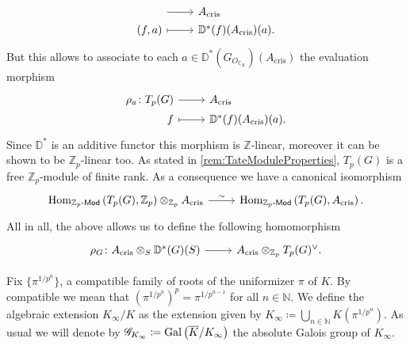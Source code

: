 \begin{rem}[]
\begin{equation*}
\begin{tikzcd}[row sep = 0ex
		,/tikz/column 1/.append style={anchor=base east}
		,/tikz/column 2/.append style={anchor=base west}]
		\arrow[r, "", rightarrow] &
		A_{\mathrm{cris}} \\
		(f,a) \arrow[r, "", mapsto] &
		\mathbb{D}^*(f)(A_{\mathrm{cris}})(a)
	.\end{tikzcd}
	\end{equation*} 
	But this allows to associate to each $a \in \mathbb{D}^*(G_{O_{\mathbb{C}_K}})(A_{\mathrm{cris}})$
	the evaluation morphism
	\begin{equation*}
	\begin{tikzcd}[row sep = 0ex
		,/tikz/column 1/.append style={anchor=base east}
		,/tikz/column 2/.append style={anchor=base west}]
		\rho_a\colon T_p(G)
		\arrow[r, "", rightarrow] &
		A_{\mathrm{cris}} \\
		f \arrow[r, "", mapsto] & 
		\mathbb{D}^*(f)(A_{\mathrm{cris}})(a)
	.\end{tikzcd}
	\end{equation*} 
	Since $\mathbb{D}^*$ is an additive functor this morphism
	is $\mathbb{Z}$-linear, moreover it can be shown to be $\mathbb{Z}_{p}$-linear too.
	As stated in \cref{rem:TateModuleProperties}, $T_p(G)$ is a free
	$\mathbb{Z}_{p}$-module of finite rank.
	As a consequence we have a canonical isomorphism
	\begin{equation*}
	\begin{tikzcd}[row sep = 0ex
		,/tikz/column 1/.append style={anchor=base east}
		,/tikz/column 2/.append style={anchor=base west}]
		\Hom_{\mathbb{Z}_{p}\text{-}\mathsf{Mod}}
		\left( T_p(G), \mathbb{Z}_{p} \right) \otimes_{\mathbb{Z}_{p}} A_{\mathrm{cris}}
		\arrow[r, "\sim", rightarrow] &
		\Hom_{ \mathbb{Z}_{p}\text{-}\mathsf{Mod} } \left( T_p(G), A_{\mathrm{cris}} \right)
	.\end{tikzcd}
	\end{equation*} 
	All in all, the above allows us to define the following
	homomorphism
	\begin{equation*}
	\begin{tikzcd}[row sep = 0ex
		,/tikz/column 1/.append style={anchor=base east}
		,/tikz/column 2/.append style={anchor=base west}]
		\rho_G\colon 
		A_{\mathrm{cris}} \otimes_S \mathbb{D}^*(G)(S)
		\arrow[r, "", rightarrow] &
		A_{\mathrm{cris}} \otimes_{\mathbb{Z}_{p}} T_p(G)^\vee
	.\end{tikzcd}
	\end{equation*} 
\end{rem}


\begin{defn}[]
	Fix $\big\{ \pi^{1/p^n} \big\}$,
	a compatible family of roots of the uniformizer $\pi$ of $K$.
	By compatible we mean that $(\pi^{1/p^n})^p = \pi^{1/p^{n-1}}$
	for all $n \in \mathbb{N}$.
	We define the algebraic extension $K_{\infty}/K$ as the extension given
	by $K_\infty \coloneqq \bigcup_{n \in \mathbb{N}} K(\pi^{1/p^n})$.
	As usual we will denote by $\mathscr{G}_{K_\infty} \coloneqq \operatorname{Gal}
	\left( \overline{K} / K_\infty \right)$ 
	the absolute Galois group of $K_\infty$.
\end{defn}


